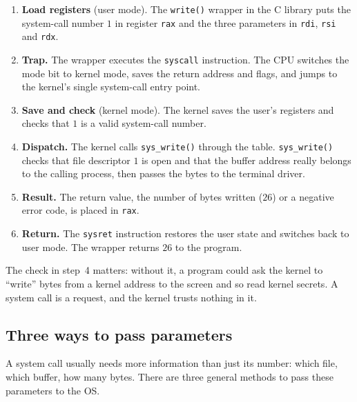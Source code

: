 \documentclass[11pt,a4paper]{article}
\newcommand{\cmd}[1]{\texttt{#1}}
\begin{document}
\begin{enumerate}[leftmargin=1.4em]
  \item \textbf{Load registers} (user mode). The \cmd{write()} wrapper in the C library puts the system-call number $1$ in register \texttt{rax} and the three parameters in \texttt{rdi}, \texttt{rsi} and \texttt{rdx}.
  \item \textbf{Trap.} The wrapper executes the \texttt{syscall} instruction. The CPU switches the mode bit to kernel mode, saves the return address and flags, and jumps to the kernel's single system-call entry point.
  \item \textbf{Save and check} (kernel mode). The kernel saves the user's registers and checks that $1$ is a valid system-call number.
  \item \textbf{Dispatch.} The kernel calls \cmd{sys\_write()} through the table. \cmd{sys\_write()} checks that file descriptor $1$ is open and that the buffer address really belongs to the calling process, then passes the bytes to the terminal driver.
  \item \textbf{Result.} The return value, the number of bytes written ($26$) or a negative error code, is placed in \texttt{rax}.
  \item \textbf{Return.} The \texttt{sysret} instruction restores the user state and switches back to user mode. The wrapper returns $26$ to the program.
\end{enumerate}

The check in step~4 matters: without it, a program could ask the kernel to ``write'' bytes from a kernel address to the screen and so read kernel secrets. A system call is a request, and the kernel trusts nothing in it.

\subsection{Three ways to pass parameters}

A system call usually needs more information than just its number: which file, which buffer, how many bytes. There are three general methods to pass these parameters to the OS.
\end{document}
